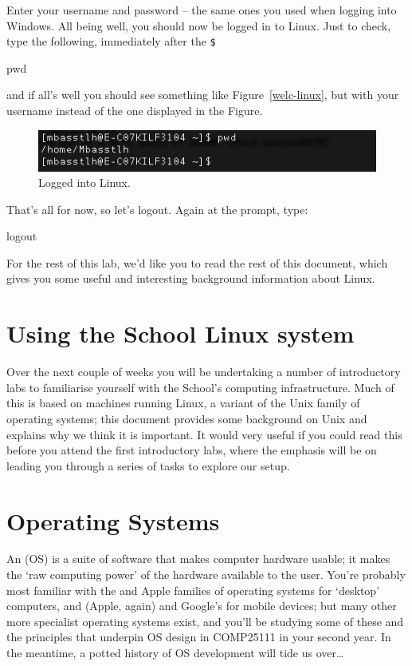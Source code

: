 Enter your username and password -- the same ones you used when
logging into Windows. All being well, you should now be logged in to
Linux. Just to check, type the following, immediately after the \verb|$|

\begin{ttoutenv}
pwd
\end{ttoutenv}

and if all's well you should see something like
Figure~\ref{welc-linux}, but with your username instead of the one
displayed in the Figure.

\begin{figure}
\centerline{\includegraphics[width=15cm]{images/welc-linux.png}}
\caption{Logged into Linux.}
\label{figure:welc-linux}
\end{figure}

That's all for now, so let's logout. Again at the prompt, type:

\begin{ttoutenv}
logout
\end{ttoutenv}

For the rest of this lab, we'd like you to read the rest of this
document, which gives you some useful and interesting background
information about Linux.

\section{Using the School Linux system}

Over the next couple of weeks you will be undertaking a number of
introductory labs to familiarise yourself with the School's computing
infrastructure. Much of this is based on machines running Linux, a
variant of the Unix family of operating systems; this document
provides some background on Unix and explains why we think it is
important. It would very useful if you could read this before you
attend the first introductory labs, where the emphasis will be on
leading you through a series of tasks to explore our setup.

\section{Operating Systems}

An  (OS) is a suite of
software that makes computer hardware usable; it makes the `raw
computing power' of the hardware available to the user. You're
probably most familiar with
the  and
Apple  families of operating systems for
`desktop' computers, and  (Apple, again) and
Google's  for mobile
devices; but many other more specialist operating systems exist, and
you'll be studying some of these and the principles that underpin OS
design in COMP25111 in your second year. In the meantime, a potted
history of OS development will tide us over\ldots
 

